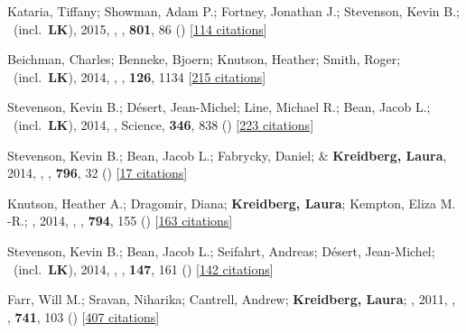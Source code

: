 \item[{\color{numcolor}\scriptsize7}] Kataria, Tiffany; Showman, Adam P.; Fortney, Jonathan J.; Stevenson, Kevin B.; \etal\ (incl.\ \textbf{LK}), 2015, , \apj, \textbf{801}, 86 () [\href{https://ui.adsabs.harvard.edu/abs/2015ApJ...801...86K}{114 citations}]

\item[{\color{numcolor}\scriptsize6}] Beichman, Charles; Benneke, Bjoern; Knutson, Heather; Smith, Roger; \etal\ (incl.\ \textbf{LK}), 2014, , \pasp, \textbf{126}, 1134 [\href{https://ui.adsabs.harvard.edu/abs/2014PASP..126.1134B}{215 citations}]

\item[{\color{numcolor}\scriptsize5}] Stevenson, Kevin B.; D{\'e}sert, Jean-Michel; Line, Michael R.; Bean, Jacob L.; \etal\ (incl.\ \textbf{LK}), 2014, , Science, \textbf{346}, 838 () [\href{https://ui.adsabs.harvard.edu/abs/2014Sci...346..838S}{223 citations}]

\item[{\color{numcolor}\scriptsize4}] Stevenson, Kevin B.; Bean, Jacob L.; Fabrycky, Daniel; \& \textbf{Kreidberg, Laura}, 2014, , \apj, \textbf{796}, 32 () [\href{https://ui.adsabs.harvard.edu/abs/2014ApJ...796...32S}{17 citations}]

\item[{\color{numcolor}\scriptsize3}] Knutson, Heather A.; Dragomir, Diana; \textbf{Kreidberg, Laura}; Kempton, Eliza M. -R.; \etal, 2014, , \apj, \textbf{794}, 155 () [\href{https://ui.adsabs.harvard.edu/abs/2014ApJ...794..155K}{163 citations}]

\item[{\color{numcolor}\scriptsize2}] Stevenson, Kevin B.; Bean, Jacob L.; Seifahrt, Andreas; D{\'e}sert, Jean-Michel; \etal\ (incl.\ \textbf{LK}), 2014, , \aj, \textbf{147}, 161 () [\href{https://ui.adsabs.harvard.edu/abs/2014AJ....147..161S}{142 citations}]

\item[{\color{numcolor}\scriptsize1}] Farr, Will M.; Sravan, Niharika; Cantrell, Andrew; \textbf{Kreidberg, Laura}; \etal, 2011, , \apj, \textbf{741}, 103 () [\href{https://ui.adsabs.harvard.edu/abs/2011ApJ...741..103F}{407 citations}]